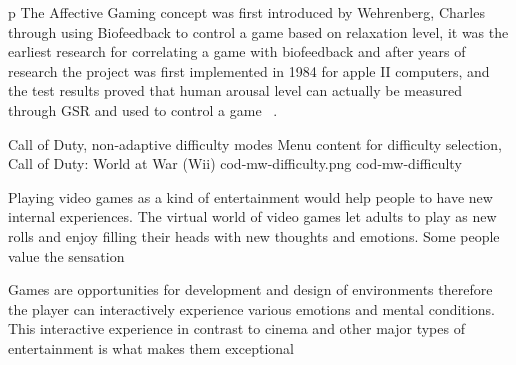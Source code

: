 \documentclass{uofsthesis-cs}
\begin{document}
p The Affective Gaming concept was first introduced by Wehrenberg, Charles through using Biofeedback to control a game based on relaxation level, it was the earliest research for correlating a game with biofeedback and after years of research the project was first implemented in 1984 for apple II computers, and the test results proved that human arousal level can actually be measured through GSR and used to control a game  ~\cite{wehrenberg1995willball}.

\img
{Call of Duty, non-adaptive difficulty modes}
{Menu content for difficulty selection, Call of Duty: World at War (Wii)}
{cod-mw-difficulty.png}
{cod-mw-difficulty}

Playing video games as a kind of entertainment would help people to have new internal
experiences. The virtual world of video games let adults to play as new rolls and enjoy filling
their heads with new thoughts and emotions. Some people value
the sensation

Games are opportunities for development and design of environments therefore
the player can interactively experience various emotions and mental conditions.
This interactive experience in contrast to cinema
and other major types of entertainment is what makes them exceptional



\end{document}
